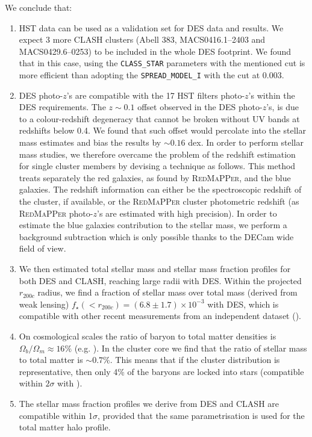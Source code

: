 {We conclude that:
\begin{enumerate}
\item HST data can be used as a validation set for DES data and results. We expect 3 more CLASH clusters (Abell 383, MACS0416.1--2403 and MACS0429.6--0253) to be included in the whole DES footprint.
We found that in this case, using the \texttt{CLASS\_STAR} parameters with the mentioned cut is more efficient than adopting the \texttt{SPREAD\_MODEL\_I} with the cut at 0.003.
\item DES photo-$z$'s are compatible with the 17 HST filters photo-$z$'s within the DES requirements. The $z\sim0.1$ offset observed in the DES photo-$z$'s, is due to a colour-redshift degeneracy that cannot be broken without UV bands at redshifts below 0.4. We found that such offset would percolate into the stellar mass estimates and bias the results by $\sim 0.16$ dex. In order to perform stellar mass studies, we therefore overcame the problem of the redshift estimation for single cluster members by devising a technique as follows. This method treats separately the red galaxies, as found by \textsc{RedMaPPer}, and the blue galaxies. The redshift information can either be the spectroscopic redshift of the cluster, if available, or the \textsc{RedMaPPer} cluster photometric redshift (as \textsc{RedMaPPer} photo-$z$'s are estimated with high precision). In order to estimate the blue galaxies contribution to the stellar mass, we perform a background subtraction which is only possible thanks to the DECam wide field of view. 
\item We then estimated total stellar mass and stellar mass fraction profiles for both DES and CLASH, reaching large radii with DES. Within the projected $r_{200c}$ radius, we find a fraction of stellar mass over total mass (derived from weak lensing) $f_\star (<r_{200c})=(6.8\pm 1.7)\times10^{-3}$ with DES, which is compatible with other recent measurements from an independent dataset (\citealt{bahcall}).
\item On cosmological scales the ratio of baryon to total matter densities is $\Omega_b / \Omega_m \approx 16\%$ (e.g. \citealt{planck15}). In the cluster core we find  that the ratio of stellar mass to total matter is $\sim 0.7\%$. This means that if the cluster distribution is representative, then only 4\% of the baryons are locked into stars (compatible within $2\sigma$ with \citealt{Fukugita}).
\item The stellar mass fraction profiles we derive from DES and CLASH are compatible within 1$\sigma$, provided that the same parametrisation is used for the total matter halo profile.

\end{enumerate}}
